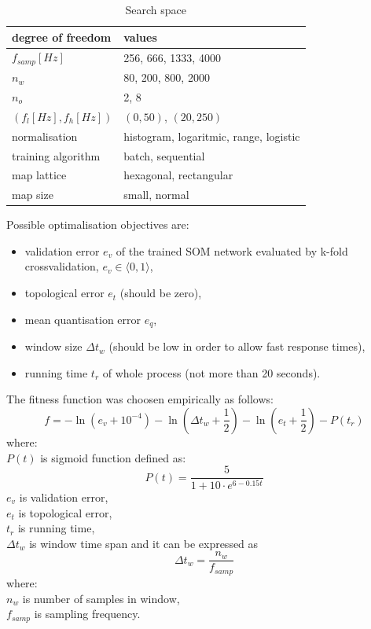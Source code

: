 \documentclass[a4paper]{IEEEtran}
\begin{document}
\begin{table}[h]
\caption{Search space}
	\begin{center}
		\begin{tabular}{|l| l |}
			\hline
			degree of freedom & values \\
			\hline
			\hline
			$ f_{samp} [Hz] $ & 256, 666, 1333, 4000\\
			\hline
			$ n_w $ & 80, 200, 800, 2000 \\
			\hline
			$ n_o $ & 2, 8 \\
			\hline
			$ (f_l[Hz], f_h[Hz]) $ & $ (0, 50) $,  $ (20, 250) $  \\
			\hline
			normalisation & histogram, logaritmic, range, logistic \\
			\hline
			training algorithm & batch, sequential  \\
			\hline
			map lattice & hexagonal, rectangular \\
			\hline
			map size  & small, normal \\
			\hline
		\end{tabular}
	\end{center}
\label{searchspace}
\end{table}

Possible optimalisation objectives are:
\begin{itemize}
	\item validation error $ e_v $ of the trained SOM network evaluated by k-fold
	crossvalidation, $ e_v \in \langle 0, 1 \rangle $,
	\item topological error $ e_t $ (should be zero),
	\item mean quantisation error $ e_q $,
	\item window size $ \Delta t_w $ (should be low in order to allow fast response times),
	\item running time $ t_r $ of whole process (not more than 20 seconds).
\end{itemize}

The fitness function was choosen empirically as follows:
\[ f = -\ln(e_v+10^{-4}) - \ln(\Delta t_w+\frac{1}{2}) - \ln(e_t+\frac{1}{2}) - P(t_r) \]
where:\\
$ P(t) $ is sigmoid function defined as:
\[ P(t) = \frac{5}{1+10\cdot e^{6-0.15t}} \]
$ e_v $ is validation error,\\
$ e_t $ is topological error,\\
$ t_r $ is running time,\\
$ \Delta t_w $ is window time span and it can be expressed as 
\[  \Delta t_w = \frac{n_w}{f_{samp}}  \]
where:\\
$ n_w $ is number of samples in window,\\
$ f_{samp} $ is sampling frequency.
\end{document}
